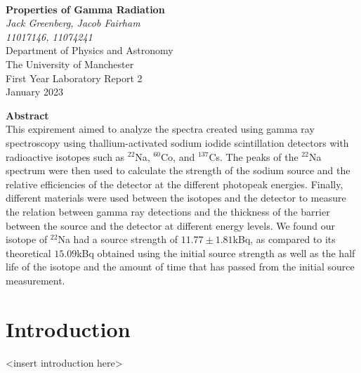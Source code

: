 \documentclass[12pt, a4paper]{article}
\begin{document}
\begin{center}

\noindent \\[10pt]
\color{black}

\thispagestyle{empty} %

\Large{\textbf{Properties of Gamma Radiation}} \\[30pt]
\normalsize \textit{Jack Greenberg, Jacob Fairham}\\[5pt]
\textit{11017146,  11074241}\\[20pt]
Department of Physics and Astronomy \\[5pt]
The University of Manchester \\[20pt]
First Year Laboratory Report 2 \\[20pt]
January 2023 \\[25pt]

\end{center}

\textbf{Abstract}\\[12pt]
This expirement aimed to analyze the spectra created using gamma ray spectroscopy using thallium-activated sodium iodide scintillation detectors with radioactive isotopes such as $^{22}$Na, $^{60}$Co, and $^{137}$Cs. The peaks of the $^{22}$Na spectrum were then used to calculate the strength of the sodium source and the relative efficiencies of the detector at the different photopeak energies. Finally, different materials were used between the isotopes and the detector to measure the relation between gamma ray detections and the thickness of the barrier between the source and the detector at different energy levels. We found our isotope of $^{22}$Na had a source strength of $11.77\pm1.81$kBq, as compared to its theoretical $15.09$kBq obtained using the initial source strength as well as the half life of the isotope and the amount of time that has passed from the initial source measurement.

\noindent 

\pagebreak

\section{Introduction}
	<insert introduction here>
\end{document}
